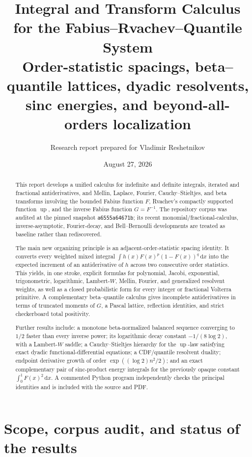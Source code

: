\documentclass[11pt,oneside]{article}
\title{\bfseries Integral and Transform Calculus\\[0.25em]
for the Fabius--Rvachev--Quantile System\\[0.65em]
\large Order-statistic spacings, beta--quantile lattices, dyadic resolvents,\\
sinc energies, and beyond-all-orders localization}
\author{Research report prepared for Vladimir Reshetnikov}
\date{August 27, 2026}
\theoremstyle{definition}
\theoremstyle{remark}
\newcommand{\F}{F}
\newcommand{\G}{G}
\newcommand{\Up}{\operatorname{up}}
\newcommand{\dd}{\,\mathrm d}
\begin{document}
\maketitle

\begin{abstract}
This report develops a unified calculus for indefinite and definite integrals,
iterated and fractional antiderivatives, and Mellin, Laplace, Fourier,
Cauchy--Stieltjes, and beta transforms involving the bounded Fabius function
\(\F\), Rvachev's compactly supported function \(\Up\), and the inverse Fabius
function \(\G=\F^{-1}\).  The repository corpus was audited at the pinned
snapshot \texttt{a6555a64671b}; its recent
monomial/fractional-calculus, inverse-asymptotic, Fourier-decay, and
Bell--Bernoulli developments are treated as baseline rather than rediscovered.

The main new organizing principle is an adjacent-order-statistic spacing
identity.  It converts every weighted mixed integral
\(\int h(x)\F(x)^p(1-\F(x))^q\dd x\) into the expected increment of an
antiderivative of \(h\) across two consecutive order statistics.  This yields,
in one stroke, explicit formulas for polynomial, Jacobi, exponential,
trigonometric, logarithmic, Lambert-\(W\), Mellin, Fourier, and generalized
resolvent weights, as well as a closed probabilistic form for every integer or
fractional Volterra primitive.  A complementary beta--quantile calculus gives
incomplete antiderivatives in terms of truncated moments of \(\G\), a Pascal
lattice, reflection identities, and strict checkerboard total positivity.

Further results include: a monotone beta-normalized balanced sequence converging
to \(1/2\) faster than every inverse power; its logarithmic decay constant
\(-1/(8\log2)\), with a Lambert-\(W\) saddle; a Cauchy--Stieltjes hierarchy for
the \(\Up\)-law satisfying exact dyadic functional-differential equations; a
CDF/quantile resolvent duality; endpoint derivative growth of order
\(\exp((\log2)n^2/2)\); and an exact complementary pair of sinc-product energy
integrals for the previously opaque constant \(\int_0^1\F(x)^2\dd x\).
A commented Python program independently checks the principal identities and
is included with the source and PDF.
\end{abstract}

\tableofcontents
\newpage

\section{Scope, corpus audit, and status of the results}
\end{document}
